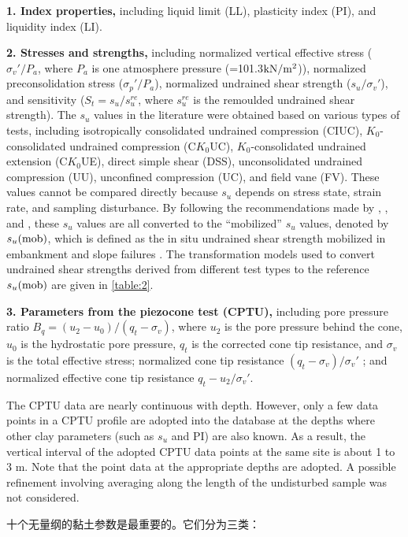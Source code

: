 \begin{Parallel}{0.60\textwidth}{}
{        \textbf{1. Index properties,} including liquid limit (LL), plasticity index (PI), and liquidity index (LI). 

        \textbf{2. Stresses and strengths,} including normalized vertical effective stress ($\sigma_v'/P_a$, where $P_a$ is one atmosphere pressure (=101.3$\rm{kN/m^2}$)), normalized preconsolidation stress ($\sigma_p'/P_a$), normalized undrained shear strength ($s_u/\sigma_v'$), and sensitivity ($S_t=s_u/s_u^{re}$, where $s_u^{re}$ is the remoulded undrained shear strength). The $s_u$ values in the literature were obtained based on various types of tests, including isotropically consolidated undrained compression (CIUC), $K_0$-consolidated undrained compression (C$K_0$UC), $K_0$-consolidated undrained extension (C$K_0$UE), direct simple shear (DSS), unconsolidated undrained compression (UU), unconfined compression (UC), and field vane (FV). These values cannot be compared directly because $s_u$ depends on stress state, strain rate, and sampling disturbance. By following the recommendations made by \citet{Bjerrum19721}, \citet{Kulhawy1990}, and \citet{Mesri20071}, these $s_u$ values are all converted to the “mobilized” $s_u$ values, denoted by $s_u(\rm{mob})$, which is defined as the in situ undrained shear strength mobilized in embankment and slope failures \citep{Mesri20071}. The transformation models used to convert undrained shear strengths derived from different test types to the reference $s_u(\rm{mob})$ are given in \autoref{table:2}. 

        \textbf{3. Parameters from the piezocone test (CPTU),} including pore pressure ratio $B_q=(u_2-u_0)/(q_t-\sigma_v)$, where $u_2$ is the pore pressure behind the cone, $u_0$ is the hydrostatic pore pressure, $q_t$ is the corrected cone tip resistance, and $\sigma_v$ is the total effective stress; normalized cone tip resistance $(q_t-\sigma_v)/\sigma_v'$ ; and normalized effective cone tip resistance $q_t-u_2/\sigma_v'$. \par
        The CPTU data are nearly continuous with depth. However, only a few data points in a CPTU profile are adopted into the database at the depths where other clay parameters (such as $s_u$ and PI) are also known. As a result, the vertical interval of the adopted CPTU data points at the same site is about 1 to 3 m. Note that the point data at the appropriate depths are adopted. A possible refinement involving averaging along the length of the undisturbed sample was not considered.
    }
    \ParallelRText
    {
        十个无量纲的黏土参数是最重要的。它们分为三类：

}
\end{Parallel}
